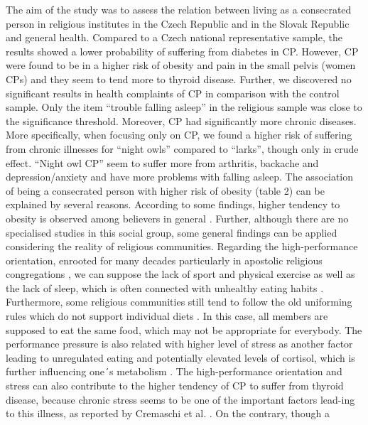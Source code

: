 \documentclass[ijerph,article,accept,moreauthors,pdftex]{mdpi}
\begin{document}
The aim of the study was to assess the relation between living as a
consecrated person in religious institutes in the Czech Republic and in
the Slovak Republic and general health. Compared to a Czech national
representative sample, the results showed a lower probability of
suffering from diabetes in CP. However, CP were found to be in a higher
risk of obesity and pain in the small pelvis (women CPs) and they seem
to tend more to thyroid disease. Further, we discovered no significant
results in health complaints of CP in comparison with the control
sample. Only the item ``trouble falling asleep'' in the religious sample
was close to the significance threshold. Moreover, CP had significantly
more chronic diseases. More specifically, when focusing only on CP, we
found a higher risk of suffering from chronic illnesses for ``night
owls'' compared to ``larks'', though only in crude effect. ``Night owl
CP'' seem to suffer more from arthritis, backache and depression/anxiety
and have more problems with falling asleep. The association of being a
consecrated person with higher risk of obesity (table 2) can be
explained by several reasons. According to some findings, higher
tendency to obesity is observed among believers in general
\citep{koenig2012religion}. Further, although there are no specialised
studies in this social group, some general findings can be applied
considering the reality of religious communities. Regarding the
high-performance orientation, enrooted for many decades particularly in
apostolic religious congregations \citep{jakvsivcova2021sluzebnici}, we
can suppose the lack of sport and physical exercise as well as the lack
of sleep, which is often connected with unhealthy eating habits
\citep{narcisse2018mediating}. Furthermore, some religious communities
still tend to follow the old uniforming rules which do not support
individual diets \citep{jakvsivcova2012dcery}. In this case, all members
are supposed to eat the same food, which may not be appropriate for
everybody. The performance pressure is also related with higher level of
stress as another factor leading to unregulated eating
\citep{ling2021relationships, leow2021understanding} and potentially
elevated levels of cortisol, which is further influencing one´s
metabolism \citep{kistenmacher2018psychosocial}. The high-performance
orientation and stress can also contribute to the higher tendency of CP
to suffer from thyroid disease, because chronic stress seems to be one
of the important factors lead-ing to this illness, as reported by
Cremaschi et al. \citep{cremaschi2000chronic}. On the contrary, though a
\end{document}
